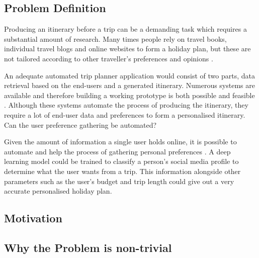 \subsection{Problem Definition}

        Producing an itinerary before a trip can be a demanding task
        which requires  a substantial amount of  research. Many times
        people rely on travel books, individual travel blogs and online
        websites to form a holiday plan, but these are not tailored according 
        to other traveller’s preferences and opinions \cite{DeChoudhury2010}. 

        An adequate automated trip planner application would consist
        of two parts, data retrieval based on the end-users and a
        generated itinerary. Numerous systems are available and 
        therefore building a working prototype is both possible and feasible 
        \cite{Sylejmani2017,Sylejmani2012,Sebastia2009a,Tumas2009, 
        Vansteenwegen2011,Kurata2013, RamalhoBrilhante2014, 
        DeChoudhury2010,DUNSTALL2008a, DiBitonto2010a,Gavalas}. 
        Although these systems automate the process of producing the 
        itinerary, they require a lot of end-user data and preferences 
        to form a personalised itinerary. Can the user preference 
        gathering be automated?

        Given the amount of information a single user holds online, 
        it is possible to automate and help the process of 
        gathering personal preferences \cite{Buraya2017}. A deep 
        learning model could be trained to classify a person's social
        media profile to determine what the user wants from a trip. 
        This information alongside other parameters such as the user's
        budget and trip length could give out a very accurate 
        personalised holiday plan.

\subsection{Motivation}
\subsection{Why the Problem is non-trivial}
